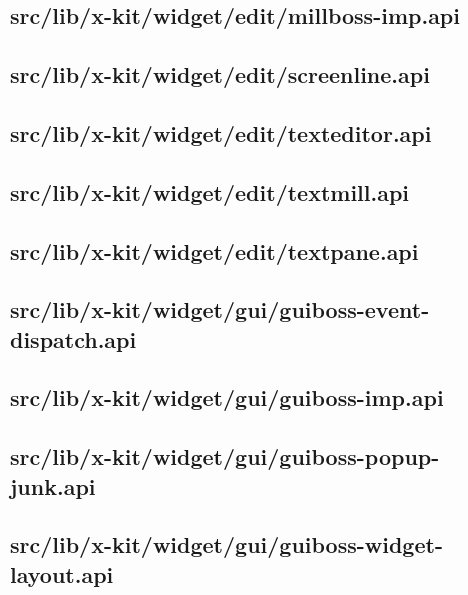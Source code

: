 \subsection{src/lib/x-kit/widget/edit/millboss-imp.api}


\subsection{src/lib/x-kit/widget/edit/screenline.api}


\subsection{src/lib/x-kit/widget/edit/texteditor.api}


\subsection{src/lib/x-kit/widget/edit/textmill.api}


\subsection{src/lib/x-kit/widget/edit/textpane.api}


\subsection{src/lib/x-kit/widget/gui/guiboss-event-dispatch.api}


\subsection{src/lib/x-kit/widget/gui/guiboss-imp.api}


\subsection{src/lib/x-kit/widget/gui/guiboss-popup-junk.api}


\subsection{src/lib/x-kit/widget/gui/guiboss-widget-layout.api}


